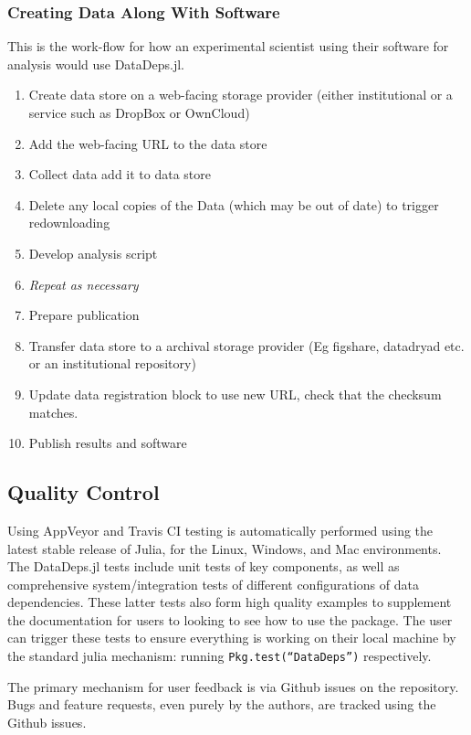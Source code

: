 \documentclass{jors}
\begin{document}
\subsubsection{Creating Data Along With Software}
This is the work-flow for how an experimental scientist using their software for analysis would use DataDeps.jl.
\begin{enumerate}
	\item Create data store on a web-facing storage provider (either institutional or a service such as DropBox or OwnCloud)
	\item Add the web-facing URL to the data store 
	\item Collect data add it to data store
	\item Delete any local copies of the Data (which may be out of date) to trigger redownloading
	\item Develop analysis script
	\item \emph{Repeat as necessary}
	\item Prepare publication
	\item Transfer data store to a archival storage provider (Eg figshare, datadryad etc. or an institutional repository)
	\item Update data registration block to use new URL, check that the checksum matches.
	\item Publish results and software
\end{enumerate}



\subsection{Quality Control}

Using AppVeyor and Travis CI testing is automatically performed using the latest stable release of Julia, for the Linux, Windows, and Mac environments.
The DataDeps.jl tests include unit tests of key components, as well as comprehensive system/integration tests of different configurations of data dependencies.
These latter tests also form high quality examples to supplement the documentation for users to looking to see how to use the package.
The user can trigger these tests to ensure everything is working on their local machine by the standard julia mechanism: running \texttt{Pkg.test(``DataDeps'')} respectively.


The primary mechanism for user feedback is via Github issues on the repository.
Bugs and feature requests, even purely by the authors, are tracked using the Github issues.
\end{document}
